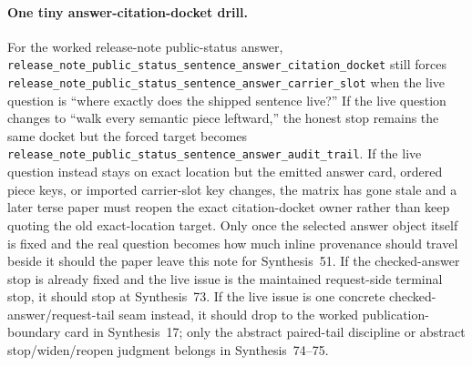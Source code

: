 \documentclass[11pt]{article}
\begin{document}
\paragraph{One tiny answer-citation-docket drill.}
For the worked release-note public-status answer, \nolinkurl{release_note_public_status_sentence_answer_citation_docket} still forces \nolinkurl{release_note_public_status_sentence_answer_carrier_slot} when the live question is ``where exactly does the shipped sentence live?'' If the live question changes to ``walk every semantic piece leftward,'' the honest stop remains the same docket but the forced target becomes \nolinkurl{release_note_public_status_sentence_answer_audit_trail}. If the live question instead stays on exact location but the emitted answer card, ordered piece keys, or imported carrier-slot key changes, the matrix has gone stale and a later terse paper must reopen the exact citation-docket owner rather than keep quoting the old exact-location target. Only once the selected answer object itself is fixed and the real question becomes how much inline provenance should travel beside it should the paper leave this note for Synthesis~51. If the checked-answer stop is already fixed and the live issue is the maintained request-side terminal stop, it should stop at Synthesis~73. If the live issue is one concrete checked-answer/request-tail seam instead, it should drop to the worked publication-boundary card in Synthesis~17; only the abstract paired-tail discipline or abstract stop/widen/reopen judgment belongs in Synthesis~74--75.\cite{series:workedexample,series:pairedterminalcitationdiscipline,series:pairedterminalcutoverrules}
\end{document}
